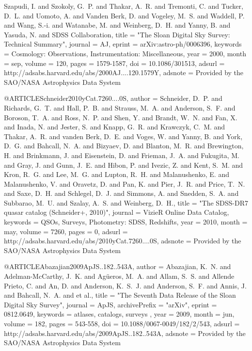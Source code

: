 \documentclass[twocolumn]{aastex62}
\def\aj{{AJ}}\def\actaa{{Acta Astron.}}\def\araa{{ARA\&A}}\def\apj{{ApJ}}\def\apjl{{ApJ}}\def\apjs{{ApJS}}\def\aap{{A\&A}}\def\aapr{{A\&A~Rev.}}\def\aaps{{A\&AS}}\def\apss{{Ap\&SS}}\def\baas{{BAAS}}\def\caa{{Chinese Astron. Astrophys.}}\def\cjaa{{Chinese J. Astron. Astrophys.}}\def\icarus{{Icarus}}\def\jcap{{J. Cosmology Astropart. Phys.}}\def\jrasc{{JRASC}}\def\memras{{MmRAS}}\def\mnras{{MNRAS}}\def\na{{New A}}\def\nar{{New A Rev.}}\def\pra{{Phys.~Rev.~A}}\def\prb{{Phys.~Rev.~B}}\def\prc{{Phys.~Rev.~C}}\def\prd{{Phys.~Rev.~D}}\def\pre{{Phys.~Rev.~E}}\def\prl{{Phys.~Rev.~Lett.}}\def\pasa{{PASA}}\def\pasp{{PASP}}\def\pasj{{PASJ}}
\begin{document}
{{	{Szapudi}, I. and {Szokoly}, G.~P. and {Thakar}, A.~R. and {Tremonti}, C. and 
	{Tucker}, D.~L. and {Uomoto}, A. and {Vanden Berk}, D. and {Vogeley}, M.~S. and 
	{Waddell}, P. and {Wang}, S.-i. and {Watanabe}, M. and {Weinberg}, D.~H. and 
	{Yanny}, B. and {Yasuda}, N. and {SDSS Collaboration}},
    title = "{The Sloan Digital Sky Survey: Technical Summary}",
  journal = {\aj},
   eprint = {arXiv:astro-ph/0006396},
 keywords = {Cosmology: Observations, Instrumentation: Miscellaneous},
     year = 2000,
    month = sep,
   volume = 120,
    pages = {1579-1587},
      doi = {10.1086/301513},
   adsurl = {http://adsabs.harvard.edu/abs/2000AJ....120.1579Y},
  adsnote = {Provided by the SAO/NASA Astrophysics Data System}
}

@ARTICLE{Schneider2010yCat.7260....0S,
   author = {{Schneider}, D.~P. and {Richards}, G.~T. and {Hall}, P.~B. and 
	{Strauss}, M.~A. and {Anderson}, S.~F. and {Boroson}, T.~A. and 
	{Ross}, N.~P. and {Shen}, Y. and {Brandt}, W.~N. and {Fan}, X. and 
	{Inada}, N. and {Jester}, S. and {Knapp}, G.~R. and {Krawczyk}, C.~M. and 
	{Thakar}, A.~R. and {vanden Berk}, D.~E. and {Voges}, W. and 
	{Yanny}, B. and {York}, D.~G. and {Bahcall}, N.~A. and {Bizyaev}, D. and 
	{Blanton}, M.~R. and {Brewington}, H. and {Brinkmann}, J. and 
	{Eisenstein}, D. and {Frieman}, J.~A. and {Fukugita}, M. and 
	{Gray}, J. and {Gunn}, J.~E. and {Hibon}, P. and {Ivezic}, Z. and 
	{Kent}, S.~M. and {Kron}, R.~G. and {Lee}, M.~G. and {Lupton}, R.~H. and 
	{Malanushenko}, E. and {Malanushenko}, V. and {Oravetz}, D. and 
	{Pan}, K. and {Pier}, J.~R. and {Price}, T.~N. and {Saxe}, D.~H. and 
	{Schlegel}, D.~J. and {Simmons}, A. and {Snedden}, S.~A. and 
	{Subbarao}, M.~U. and {Szalay}, A.~S. and {Weinberg}, D.~H.},
    title = "{The SDSS-DR7 quasar catalog (Schneider+, 2010)}",
  journal = {VizieR Online Data Catalog},
 keywords = {QSOs, Surveys, Photometry: SDSS, Redshifts},
     year = 2010,
    month = may,
   volume = 7260,
    pages = {0},
   adsurl = {http://adsabs.harvard.edu/abs/2010yCat.7260....0S},
  adsnote = {Provided by the SAO/NASA Astrophysics Data System}
}



@ARTICLE{Abazajian2009ApJS..182..543A,
   author = {{Abazajian}, K.~N. and {Adelman-McCarthy}, J.~K. and {Ag{\"u}eros}, M.~A. and 
	{Allam}, S.~S. and {Allende Prieto}, C. and {An}, D. and {Anderson}, K.~S.~J. and 
	{Anderson}, S.~F. and {Annis}, J. and {Bahcall}, N.~A. and et al.},
    title = "{The Seventh Data Release of the Sloan Digital Sky Survey}",
  journal = {\apjs},
archivePrefix = "arXiv",
   eprint = {0812.0649},
 keywords = {atlases, catalogs, surveys },
     year = 2009,
    month = jun,
   volume = 182,
    pages = {543-558},
      doi = {10.1088/0067-0049/182/2/543},
   adsurl = {http://adsabs.harvard.edu/abs/2009ApJS..182..543A},
  adsnote = {Provided by the SAO/NASA Astrophysics Data System}
}
\end{document}
